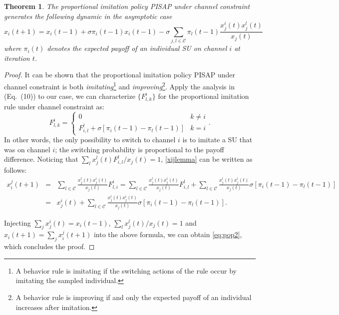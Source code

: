 \documentclass[12pt, onecolumn]{IEEEtran}
\theoremstyle{plain}
\newtheorem{theorem}{Theorem}
\theoremstyle{definition}
\begin{document}
\begin{theorem}
The proportional imitation policy PISAP under channel constraint generates the following dynamic in the asymptotic case
\begin{equation}
\label{eq:pop2}
x_i(t+1)=x_i(t-1)+\sigma\pi_i(t-1)x_i(t-1)-\sigma\sum_{j,l\in\mathcal{C}}\pi_l(t-1)\frac{x_j^i(t)x_j^l(t)}{x_j(t)}
\end{equation}
where $\pi_i(t)$ denotes the expected payoff of an individual SU on channel $i$ at iteration $t$.
\label{th:pop2}
\end{theorem}


\begin{proof}
It can be shown that the proportional imitation policy PISAP under channel constraint is both {\it imitating}\footnote{A behavior rule is imitating if the switching actions of the rule occur by imitating the sampled individual.} and {\it improving}\footnote{A behavior rule is improving if and only the expected payoff of an individual increases after imitation.}. Apply the analysis in \cite{Schlag96} (Eq.~(10)) to our case, we can characterize $\{F_{l,k}^i\}$ for the proportional imitation rule under channel constraint as:
\begin{equation*}
F_{l,k}^i=
\begin{cases}
0 & k\neq i \\
F_{i,l}^l+\sigma[\pi_i(t-1)-\pi_l(t-1)] & k=i
\end{cases}.
\end{equation*}
In other words, the only possibility to switch to channel $i$ is to imitate a SU that was on channel $i$; the switching probability is proportional to the payoff difference. Noticing that $\sum_l x_j^l(t)F_{i,l}^l/x_j(t)=1$, \eqref{xijlemma} can be written as follows:
\begin{eqnarray*}
x_i^j(t+1) &=& \sum_{l \in \mathcal{C}}  \frac{x_j^l(t)x_j^i(t)}{x_j(t)}F_{l,i}^i = \sum_{l \in \mathcal{C}}  \frac{x_j^l(t)x_j^i(t)}{x_j(t)}F_{i,l}^l+\sum_{l \in \mathcal{C}}  \frac{x_j^l(t)x_j^i(t)}{x_j(t)}\sigma[\pi_i(t-1)-\pi_l(t-1)] \\
           &=& x_j^i(t) + \sum_{l \in \mathcal{C}}  \frac{x_j^l(t)x_j^i(t)}{x_j(t)}\sigma[\pi_i(t-1)-\pi_l(t-1)].
\end{eqnarray*}

Injecting $\sum_j x_j^i(t)=x_i(t-1)$, $\sum_l x_j^l(t)/x_j(t)=1$ and $x_i(t+1)=\sum_j x_i^j(t+1)$ into the above formula, we can obtain \eqref{eq:pop2}, which concludes the proof.
\end{proof}
\end{document}
